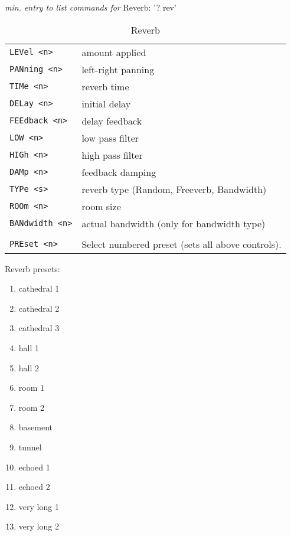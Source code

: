     \textsl{min. entry to list commands for} Reverb:  '? rev'
   \begin{table}[H]
      \centering
      \caption{Reverb}
      \begin{tabular}{l l}
\texttt{LEVel <n>} &
   amount applied \\
\texttt{PANning <n>} &
   left-right panning \\
\texttt{TIMe <n>} &
   reverb time \\
\texttt{DELay <n>} &
   initial delay \\
\texttt{FEEdback <n>} &
   delay feedback \\
\texttt{LOW <n>} &
   low pass filter \\
\texttt{HIGh <n>} &
   high pass filter \\
\texttt{DAMp <n>} &
   feedback damping \\
\texttt{TYPe <s>} &
   reverb type (Random, Freeverb, Bandwidth) \\
\texttt{ROOm <n>} &
   room size \\
\texttt{BANdwidth <n>} &
   actual bandwidth (only for bandwidth type) \\
\texttt{} & \\ %
\texttt{PREset <n>} &
   Select numbered preset (sets all above controls). \\
      \end{tabular}
   \end{table}
   Reverb presets:
   \begin{enumerate}
      \item cathedral 1
      \item cathedral 2
      \item cathedral 3
      \item hall 1
      \item hall 2
      \item room 1
      \item room 2
      \item basement
      \item tunnel
      \item echoed 1
      \item echoed 2
      \item very long 1
      \item very long 2
    \end{enumerate}

